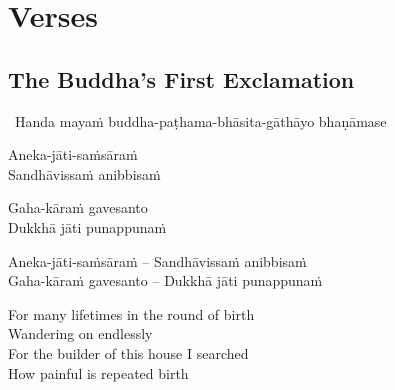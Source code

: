 
\ifdigital
\fi

\ifninebythirteen
\fi

\ifbfive
\fi

\chapter{Verses}

\ifbfive
\fi

\ifninebythirteen
  \fi



\section{The Buddha's First Exclamation}
\label{buddhas-first-exclamation}

\begin{leader}
  \anglebracketleft\ \hspace{-0.5mm}Handa mayaṁ buddha-paṭhama-bhāsita-gāthāyo bhaṇāmase \hspace{-0.5mm}\anglebracketright\
\end{leader}

\ifninebythirteen

\begin{pali-hang-verses}
  Aneka-jāti-saṁsāraṁ\\
  Sandhāvissaṁ anibbisaṁ
\end{pali-hang-verses}
\begin{pali-hang-together}
  Gaha-kāraṁ gavesanto\\
  Dukkhā jāti punappunaṁ
\end{pali-hang-together}

\else

\begin{verses}
  Aneka-jāti-saṁsāraṁ – Sandhāvissaṁ anibbisaṁ\\
  Gaha-kāraṁ gavesanto – Dukkhā jāti punappunaṁ
\end{verses}

\fi

\begin{english-verses}
  For many lifetimes in the round of birth\\
  Wandering on endlessly\\
  For the builder of this house I searched\\
  How painful is repeated birth
\end{english-verses}

